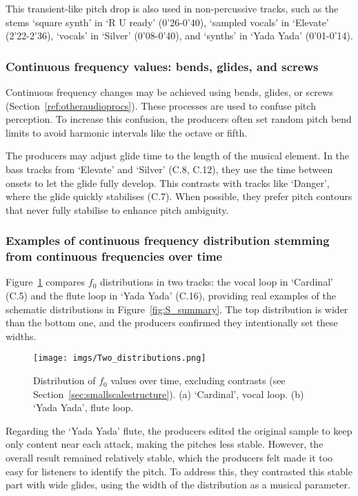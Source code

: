 \documentclass{article}
\begin{document}
This transient-like pitch drop is also used in non-percussive tracks, such as the stems `square synth' in `R U ready' (0'26-0'40), `sampled vocals' in `Elevate' (2'22-2'36), `vocals' in `Silver' (0'08-0'40), and `synths' in `Yada Yada' (0'01-0'14).


\subsubsection{Continuous frequency values: bends, glides, and screws}


Continuous frequency changes may be achieved using bends, glides, or screws (Section~\ref{ref:otheraudioprocs}). These processes are used to confuse pitch perception. To increase this confusion, the producers often set random pitch bend limits to avoid harmonic intervals like the octave or fifth. %

The producers may adjust glide time to the length of the musical element. In the bass tracks from `Elevate' and `Silver' (C.8, C.12), they use the time between onsets to let the glide fully develop. This contrasts with tracks like `Danger', where the glide quickly stabilises (C.7). When possible, they prefer pitch contours that never fully stabilise to enhance pitch ambiguity.



\subsubsection{Examples of continuous frequency distribution stemming from continuous frequencies over time}\label{sec:dists}

Figure~\ref{fig:twodistributions} compares $f_0$ distributions in two tracks: the vocal loop in `Cardinal' (C.5) and the flute loop in `Yada Yada' (C.16), providing real examples of the schematic distributions in Figure~\ref{fig:S_summary}. The top distribution is wider than the bottom one, and the producers confirmed they intentionally set these widths.


\begin{figure}[htbp]
  \centering
  \texttt{[image: imgs/Two\_distributions.png]}
  \caption{Distribution of $f_0$ values over time, excluding contrasts (see Section~\ref{sec:smallscalestructure}). (a) `Cardinal', vocal loop. (b) `Yada Yada', flute loop.}
\label{fig:twodistributions}
\end{figure}

Regarding the `Yada Yada' flute, the producers edited the original sample to keep only content near each attack, making the pitches less stable. However, the overall result remained relatively stable, which the producers felt made it too easy for listeners to identify the pitch. To address this, they contrasted this stable part with wide glides, using the width of the distribution as a musical parameter.
\end{document}
